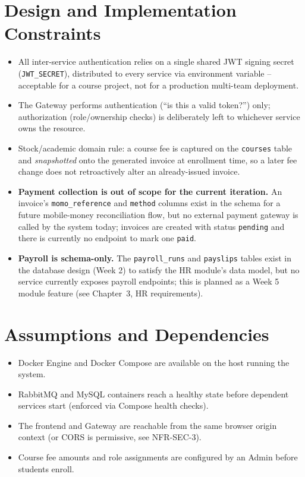 \documentclass[11pt,a4paper]{report}
\begin{document}
\section{Design and Implementation Constraints}
\label{sec:constraints}
\begin{itemize}[itemsep=2pt]
    \item All inter-service authentication relies on a single shared JWT signing secret (\texttt{JWT\_SECRET}), distributed to every service via environment variable -- acceptable for a course project, not for a production multi-team deployment.
    \item The Gateway performs authentication (``is this a valid token?'') only; authorization (role/ownership checks) is deliberately left to whichever service owns the resource.
    \item Stock/academic domain rule: a course fee is captured on the \texttt{courses} table and \emph{snapshotted} onto the generated invoice at enrollment time, so a later fee change does not retroactively alter an already-issued invoice.
    \item \textbf{Payment collection is out of scope for the current iteration.} An invoice's \texttt{momo\_reference} and \texttt{method} columns exist in the schema for a future mobile-money reconciliation flow, but no external payment gateway is called by the system today; invoices are created with status \texttt{pending} and there is currently no endpoint to mark one \texttt{paid}.
    \item \textbf{Payroll is schema-only.} The \texttt{payroll\_runs} and \texttt{payslips} tables exist in the database design (Week 2) to satisfy the HR module's data model, but no service currently exposes payroll endpoints; this is planned as a Week 5 module feature (see Chapter~3, HR requirements).
\end{itemize}

\section{Assumptions and Dependencies}
\begin{itemize}[itemsep=2pt]
    \item Docker Engine and Docker Compose are available on the host running the system.
    \item RabbitMQ and MySQL containers reach a healthy state before dependent services start (enforced via Compose health checks).
    \item The frontend and Gateway are reachable from the same browser origin context (or CORS is permissive, see NFR-SEC-3).
    \item Course fee amounts and role assignments are configured by an Admin before students enroll.
\end{itemize}
\end{document}
